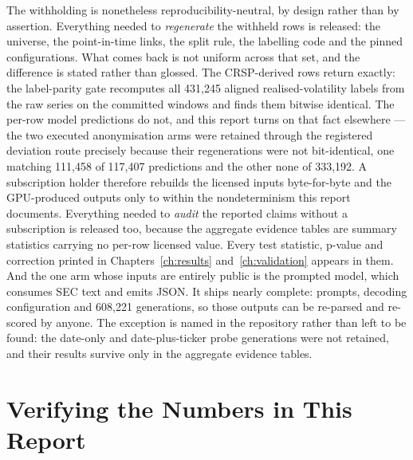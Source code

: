 The withholding is nonetheless reproducibility-neutral, by design rather than by
assertion. Everything needed to \emph{regenerate} the withheld rows is
released: the universe, the point-in-time links, the split rule, the labelling
code and the pinned configurations. What comes back is not uniform across that
set, and the difference is stated rather than glossed. The CRSP-derived rows
return exactly: the label-parity gate recomputes all 431{,}245 aligned
realised-volatility labels from the raw series on the committed windows and
finds them bitwise identical. The per-row model predictions do not, and this
report turns on that fact elsewhere --- the two executed anonymisation arms were
retained through the registered deviation route precisely because their
regenerations were not bit-identical, one matching 111{,}458 of 117{,}407
predictions and the other none of 333{,}192. A subscription holder therefore
rebuilds the licensed inputs byte-for-byte and the GPU-produced outputs only to
within the nondeterminism this report documents.
Everything needed to \emph{audit} the reported claims without a
subscription is released too, because the aggregate evidence tables are summary
statistics carrying no per-row licensed value. Every test statistic, p-value and
correction printed in Chapters~\ref{ch:results} and~\ref{ch:validation} appears
in them. And the one arm whose inputs are entirely public is the prompted model,
which consumes SEC text and emits JSON. It ships nearly complete: prompts, decoding
configuration and 608{,}221 generations, so those outputs can be re-parsed and
re-scored by anyone. The exception is named in the repository rather than left to
be found: the date-only and date-plus-ticker probe generations were not
retained, and their results survive only in the aggregate evidence tables. %

\FloatBarrier
\section{Verifying the Numbers in This Report}
\label{app:external:verify}

